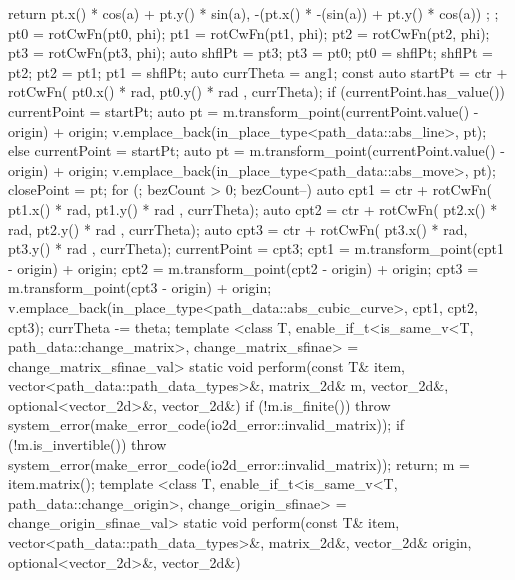 \begin{codeblock}
{{{{{            return { pt.x() * cos(a) + pt.y() * sin(a),
              -(pt.x() * -(sin(a)) + pt.y() * cos(a)) };
          };
          pt0 = rotCwFn(pt0, phi);
          pt1 = rotCwFn(pt1, phi);
          pt2 = rotCwFn(pt2, phi);
          pt3 = rotCwFn(pt3, phi);
          auto shflPt = pt3;
          pt3 = pt0;
          pt0 = shflPt;
          shflPt = pt2;
          pt2 = pt1;
          pt1 = shflPt;
          auto currTheta = ang1;
          const auto startPt =
            ctr + rotCwFn({ pt0.x() * rad, pt0.y() * rad }, currTheta);
          if (currentPoint.has_value()) {
            currentPoint = startPt;
            auto pt = m.transform_point(currentPoint.value() - origin) + origin;
            v.emplace_back(in_place_type<path_data::abs_line>, pt);
          }
          else {
            currentPoint = startPt;
            auto pt = m.transform_point(currentPoint.value() - origin) + origin;
            v.emplace_back(in_place_type<path_data::abs_move>, pt);
            closePoint = pt;
          }
          for (; bezCount > 0; bezCount--) {
            auto cpt1 = ctr + rotCwFn({ pt1.x() * rad, pt1.y() * rad },
              currTheta);
            auto cpt2 = ctr + rotCwFn({ pt2.x() * rad, pt2.y() * rad },
              currTheta);
            auto cpt3 = ctr + rotCwFn({ pt3.x() * rad, pt3.y() * rad },
              currTheta);
            currentPoint = cpt3;
            cpt1 = m.transform_point(cpt1 - origin) + origin;
            cpt2 = m.transform_point(cpt2 - origin) + origin;
            cpt3 = m.transform_point(cpt3 - origin) + origin;
            v.emplace_back(in_place_type<path_data::abs_cubic_curve>, cpt1,
              cpt2, cpt3);
            currTheta -= theta;
          }
        }
      }
      template <class T, enable_if_t<is_same_v<T, path_data::change_matrix>, 
        change_matrix_sfinae> = change_matrix_sfinae_val>
      static void perform(const T& item, vector<path_data::path_data_types>&, 
        matrix_2d& m, vector_2d&, optional<vector_2d>&, vector_2d&) {
        if (!m.is_finite()) {
          throw system_error(make_error_code(io2d_error::invalid_matrix));
        }
        if (!m.is_invertible()) {
          throw system_error(make_error_code(io2d_error::invalid_matrix));
          return;
        }
        m = item.matrix();
      }
      template <class T, enable_if_t<is_same_v<T, path_data::change_origin>, 
        change_origin_sfinae> = change_origin_sfinae_val>
      static void perform(const T& item, vector<path_data::path_data_types>&, 
        matrix_2d&, vector_2d& origin, optional<vector_2d>&, vector_2d&) {
}}}
\end{codeblock}
